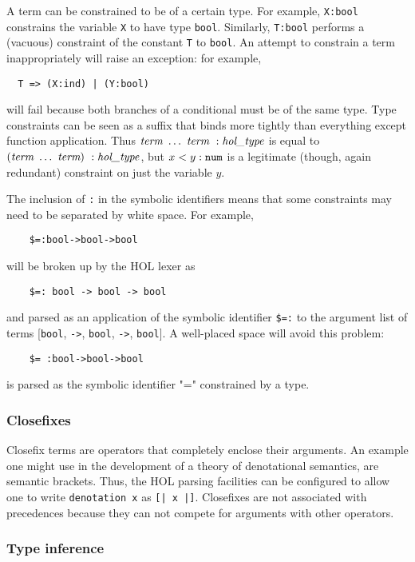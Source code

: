 \documentclass[12pt,fleqn,a4paper]{report}
\newcommand{\type}       {\mbox{\it hol\_type}}
\newcommand{\term}       {\mbox{\it term}}
\begin{document}
A term can be constrained to be of a certain type.  For example,
\verb+X:bool+ constrains the variable \verb+X+ to have type
\verb+bool+. Similarly, \verb+T:bool+ performs a (vacuous) constraint
of the constant \verb+T+ to \verb+bool+. An attempt to constrain a
term inappropriately will raise an exception: for example,
\begin{verbatim}
  T => (X:ind) | (Y:bool)
\end{verbatim}
will fail because both branches of a conditional must be of the same
type.  Type constraints can be seen as a suffix that binds more
tightly than everything except function application.  Thus $\term\
\ldots\ \term \ : \type$ is equal to $(\term\ \ldots\ \term)\ :
\type$, but $x < y:\mbox{\tt num}$ is a legitimate (though, again
redundant) constraint on just the variable $y$.

The inclusion of \verb+:+ in the symbolic identifiers means that some
constraints may need to be separated by white space. For example,
\begin{verbatim}
    $=:bool->bool->bool
\end{verbatim}
will be broken up by the HOL lexer as
\begin{verbatim}
    $=: bool -> bool -> bool
\end{verbatim}
and parsed as an application of the symbolic identifier \verb+$=:+ to
the argument list of terms [\verb+bool+, \verb+->+, \verb+bool+,
\verb+->+, \verb+bool+]. A well-placed space will avoid this problem:
\begin{verbatim}
    $= :bool->bool->bool
\end{verbatim}
is parsed as the symbolic identifier "=" constrained by a type.

\subsubsection{Closefixes}

Closefix terms are operators that completely enclose their arguments.
An example one might use in the development of a theory of
denotational semantics, are semantic brackets.  Thus, the HOL parsing
facilities can be configured to allow one to write {\tt denotation x}
as {\tt [| x |]}.  Closefixes are not associated with precedences
because they can not compete for arguments with other operators.

\subsubsection{Type inference}
\end{document}
